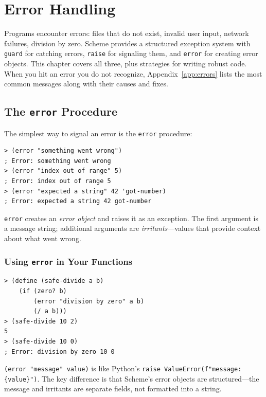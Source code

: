 \chapter{Error Handling}
\label{ch:errors}

Programs encounter errors: files that do not exist, invalid user input, network failures, division by zero. Scheme provides a structured exception system with \texttt{guard} for catching errors, \texttt{raise} for signaling them, and \texttt{error} for creating error objects. This chapter covers all three, plus strategies for writing robust code. When you hit an error you do not recognize, Appendix~\ref{app:errors} lists the most common messages along with their causes and fixes.

\section{The \texttt{error} Procedure}

The simplest way to signal an error is the \texttt{error} procedure:

\begin{lstlisting}[style=repl]
> (error "something went wrong")
; Error: something went wrong
> (error "index out of range" 5)
; Error: index out of range 5
> (error "expected a string" 42 'got-number)
; Error: expected a string 42 got-number
\end{lstlisting}

\texttt{error} creates an \emph{error object} and raises it as an exception. The first argument is a message string; additional arguments are \emph{irritants}---values that provide context about what went wrong.

\subsection{Using \texttt{error} in Your Functions}

\begin{lstlisting}[style=repl]
> (define (safe-divide a b)
    (if (zero? b)
        (error "division by zero" a b)
        (/ a b)))
> (safe-divide 10 2)
5
> (safe-divide 10 0)
; Error: division by zero 10 0
\end{lstlisting}

\begin{note}
\texttt{(error "message" value)} is like Python's \texttt{raise ValueError(f"message: \{value\}")}. The key difference is that Scheme's error objects are structured---the message and irritants are separate fields, not formatted into a string.
\end{note}

